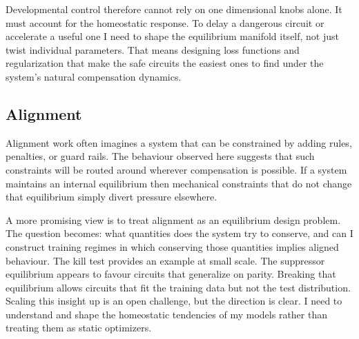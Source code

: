 Developmental control therefore cannot rely on one dimensional knobs alone. It must account for the homeostatic response. To delay a dangerous circuit or accelerate a useful one I need to shape the equilibrium manifold itself, not just twist individual parameters. That means designing loss functions and regularization that make the safe circuits the easiest ones to find under the system's natural compensation dynamics.

\subsection{Alignment}

Alignment work often imagines a system that can be constrained by adding rules, penalties, or guard rails. The behaviour observed here suggests that such constraints will be routed around wherever compensation is possible. If a system maintains an internal equilibrium then mechanical constraints that do not change that equilibrium simply divert pressure elsewhere.

A more promising view is to treat alignment as an equilibrium design problem. The question becomes: what quantities does the system try to conserve, and can I construct training regimes in which conserving those quantities implies aligned behaviour. The kill test provides an example at small scale. The suppressor equilibrium appears to favour circuits that generalize on parity. Breaking that equilibrium allows circuits that fit the training data but not the test distribution. Scaling this insight up is an open challenge, but the direction is clear. I need to understand and shape the homeostatic tendencies of my models rather than treating them as static optimizers.
